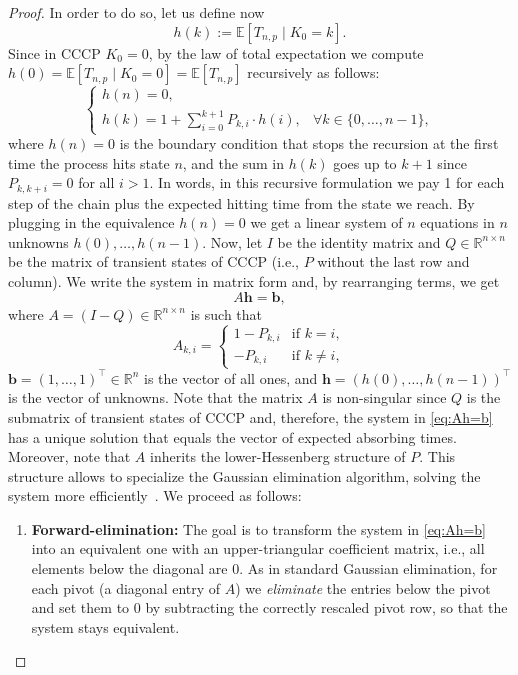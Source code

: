 \documentclass[11pt,a4paper]{article}
\newcommand{\cond}{\mid}
\newcommand{\E}{\mathbb{E}}
\begin{document}
\begin{proof}
In order to do so, let us define now
\[
    h(k) := \E[T_{n,p} \cond K_0 = k].
\]
Since in CCCP $K_0 = 0$, by the law of total expectation we compute $h(0) = \E[T_{n,p} \cond K_0 = 0]= \E[T_{n,p}]$ recursively as follows:
\[
\begin{cases}
h(n) = 0,\\
h(k) = 1 + \sum_{i=0}^{k+1} P_{k,i} \cdot h(i), & \forall k \in \{0,\ldots,n-1\},
\end{cases}
\]
where $h(n)=0$ is the boundary condition that stops the recursion at the first time the process hits state $n$, and the sum in $h(k)$ goes up to $k+1$ since $P_{k,k+i}=0$ for all $i>1$.
In words, in this recursive formulation we pay 1 for each step of the chain plus the expected hitting time from the state we reach.
By plugging in the equivalence $h(n)=0$ we get a linear system of $n$ equations in $n$ unknowns $h(0),\dots,h(n-1)$.
Now, let $I$ be the identity matrix and $Q \in \mathbb{R}^{n \times n}$ be the matrix of transient states of CCCP (i.e., $P$ without the last row and column). 
We write the system in matrix form and, by rearranging terms, we get
\begin{equation}\label{eq:Ah=b}
    A \mathbf{h} = \mathbf{b},
\end{equation}
where $A = (I - Q) \in \mathbb{R}^{n \times n}$ is such that
\[
    A_{k,i} = \begin{cases}
        1 - P_{k,i} & \text{if } k=i,
        \\
        - P_{k,i} & \text{if } k\neq i,
    \end{cases}
\]
$\mathbf{b} = (1, \ldots, 1)^\intercal \in \mathbb{R}^n$ is the vector of all ones, and $\mathbf{h} = (h(0), \ldots, h(n-1))^\intercal$ is the vector of unknowns.
% 
Note that the matrix $A$ is non-singular since $Q$ is the submatrix of transient states of CCCP and, therefore, the system in \cref{eq:Ah=b} has a unique solution that equals the vector of expected absorbing times.
Moreover, note that $A$ inherits the lower-Hessenberg structure of $P$. 
This structure allows to specialize the Gaussian elimination algorithm, solving the system more efficiently~\cite{golub2013matrix}.
We proceed as follows:
\begin{enumerate}
  \item \textbf{Forward-elimination:} The goal is to transform the system in \cref{eq:Ah=b} into an equivalent one with an upper-triangular coefficient matrix, i.e., all elements below the diagonal are 0.
    As in standard Gaussian elimination, for each pivot (a diagonal entry of $A$) we \textit{eliminate} the entries below the pivot and set them to 0 by subtracting the correctly rescaled pivot row, so that the system stays equivalent. 

\end{enumerate}
\end{proof}
\end{document}
